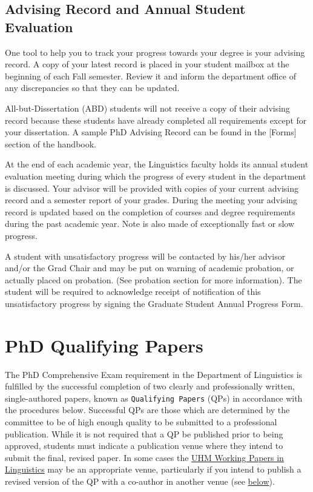 \documentclass[
]{book}
\begin{document}
\section{Advising Record and Annual Student Evaluation}\label{advising-record-and-annual-student-evaluation}

One tool to help you to track your progress towards your degree is your advising record. A copy of your latest record is placed in your student mailbox at the beginning of each Fall semester. Review it and inform the department office of any discrepancies so that they can be updated.

All-but-Dissertation (ABD) students will not receive a copy of their advising record because these students have already completed all requirements except for your dissertation. A sample PhD Advising Record can be found in the {[}Forms{]} section of the handbook.

At the end of each academic year, the Linguistics faculty holds its annual student evaluation meeting during which the progress of every student in the department is discussed. Your advisor will be provided with copies of your current advising record and a semester report of your grades. During the meeting your advising record is updated based on the completion of courses and degree requirements during the past academic year. Note is also made of exceptionally fast or slow progress.

A student with unsatisfactory progress will be contacted by his/her advisor and/or the Grad Chair and may be put on warning of academic probation, or actually placed on probation. (See probation section for more information). The student will be required to acknowledge receipt of notification of this unsatisfactory progress by signing the Graduate Student Annual Progress Form.

\chapter{PhD Qualifying Papers}\label{qp}

The PhD Comprehensive Exam requirement in the Department of Linguistics is fulfilled by the successful completion of two clearly and professionally written, single-authored papers, known as \texttt{Qualifying\ Papers} (QPs) in accordance with the procedures below. Successful QPs are those which are determined by the committee to be of high enough quality to be submitted to a professional publication. While it is not required that a QP be published prior to being approved, students must indicate a publication venue where they intend to submit the final, revised paper. In some cases the \hyperref[wp]{UHM Working Papers in Linguistics} may be an appropriate venue, particularly if you intend to publish a revised version of the QP with a co-author in another venue (see \hyperref[wp]{below}).
\end{document}
